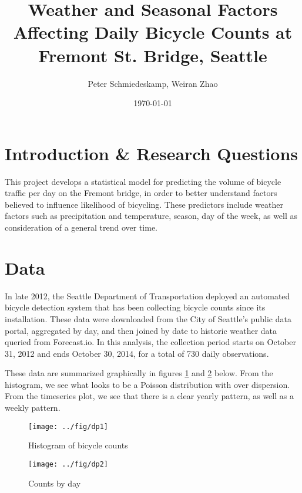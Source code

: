 \documentclass[final]{beamer}
\title
[CSSS 501 MLE Poster Session, 17 November 2014 -- http://github.com/pschmied/bikecounts-mle] %
{ %
  Weather and Seasonal Factors Affecting Daily Bicycle Counts at
  Fremont St. Bridge, Seattle %
}
\author{ %
Peter Schmiedeskamp\inst{1}, Weiran Zhao\inst{1}
}
\institute
[University of Washington] %
{
\inst{1} University of Washington, Seattle
}
\date{\today}
\begin{document}
\begin{frame}[t]
\begin{multicols}{3}

\section{Introduction \& Research Questions}
This project develops a statistical model for predicting the volume of
bicycle traffic per day on the Fremont bridge, in order to better
understand factors believed to influence likelihood of bicycling.
These predictors include weather factors such as precipitation and
temperature, season, day of the week, as well as consideration of a
general trend over time.

\section{Data}
In late 2012, the Seattle Department of Transportation deployed an
automated bicycle detection system that has been collecting bicycle
counts since its installation. These data were downloaded from the
City of Seattle's public data portal, aggregated by day, and then
joined by date to historic weather data queried from Forecast.io. In
this analysis, the collection period starts on October 31, 2012 and
ends October 30, 2014, for a total of 730 daily observations.

These data are summarized graphically in figures \ref{fg:hist} and
\ref{fg:timeseries} below. From the histogram, we see what looks to be
a Poisson distribution with over dispersion. From the timeseries plot,
we see that there is a clear yearly pattern, as well as a weekly
pattern.

\begin{figure}[htbp]
\begin{center}
\texttt{[image: ../fig/dp1]}
\caption{Histogram of bicycle counts}
\label{fg:hist}
\end{center}
\end{figure}

\begin{figure}[htbp]
\begin{center}
\texttt{[image: ../fig/dp2]}
\caption{Counts by day}
\label{fg:timeseries}
\end{center}
\end{figure}



\end{multicols}
\end{frame}
\end{document}
